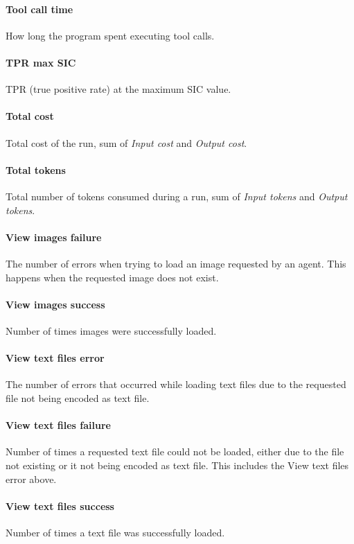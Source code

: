 \documentclass[submission, Phys]{SciPost}
\begin{document}
\paragraph{Tool call time} How long the program spent executing tool calls.

\paragraph{TPR max SIC} TPR (true positive rate) at the maximum SIC value.

\paragraph{Total cost} Total cost of the run, sum of \emph{Input cost} and \emph{Output cost}.

\paragraph{Total tokens}  Total number of tokens consumed during a run, sum of \emph{Input tokens} and \emph{Output tokens}.

\paragraph{View images failure}  The number of errors when trying to load an image requested by an agent. This happens when the requested image does not exist.

\paragraph{View images success}  Number of times images were successfully loaded.

\paragraph{View text files error}  The number of errors that occurred while loading text files due to the requested file not being encoded as text file.

\paragraph{View text files failure}  Number of times a requested text file could not be loaded, either due to the file not existing or it not being encoded as text file. This includes the View text files error above.

\paragraph{View text files success}  Number of times a text file was successfully loaded.
\end{document}
